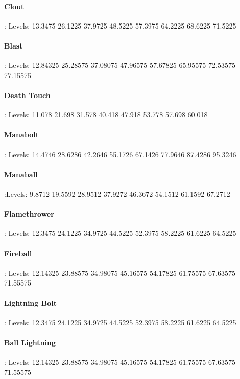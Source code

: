 \begin{multicols*}{2}
	\paragraph{Clout}: Levels: 13.3475 26.1225 37.9725 48.5225 57.3975 64.2225 68.6225 71.5225
	
	\paragraph{Blast}: 	Levels: 12.84325 25.28575 37.08075 47.96575 57.67825 65.95575 72.53575 77.15575
	
	\paragraph{Death Touch}: Levels: 11.078 21.698 31.578 40.418 47.918 53.778 57.698 60.018
	
	\paragraph{Manabolt}: Levels: 14.4746 28.6286 42.2646 55.1726 67.1426 77.9646 87.4286 95.3246
	
	\paragraph{Manaball}:Levels: 9.8712 19.5592 28.9512 37.9272 46.3672 54.1512 61.1592 67.2712
	
	\paragraph{Flamethrower}: Levels: 12.3475 24.1225 34.9725 44.5225 52.3975 58.2225 61.6225 64.5225
	
	\paragraph{Fireball}: Levels: 12.14325 23.88575 34.98075 45.16575 54.17825 61.75575 67.63575 71.55575
	
	\paragraph{Lightning Bolt}: Levels: 12.3475 24.1225 34.9725 44.5225 52.3975 58.2225 61.6225 64.5225
	
	\paragraph{Ball Lightning}: Levels: 12.14325 23.88575 34.98075 45.16575 54.17825 61.75575 67.63575 71.55575
	

\end{multicols*}
